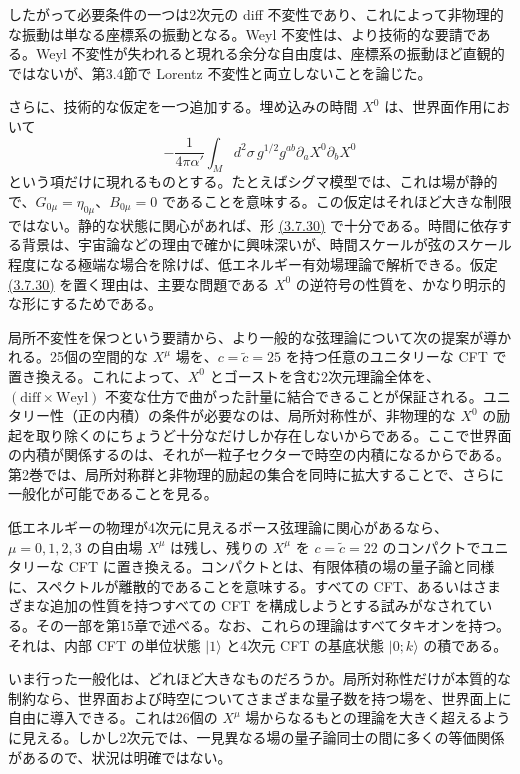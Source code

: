 したがって必要条件の一つは2次元の diff 不変性であり、これによって非物理的な振動は単なる座標系の振動となる。Weyl 不変性は、より技術的な要請である。Weyl 不変性が失われると現れる余分な自由度は、座標系の振動ほど直観的ではないが、第3.4節で Lorentz 不変性と両立しないことを論じた。

さらに、技術的な仮定を一つ追加する。埋め込みの時間 $X^0$ は、世界面作用において
\begin{equation}
-\frac1{4\pi\alpha'}\int_M d^2\sigma\,g^{1/2}g^{ab}
\partial_aX^0\partial_bX^0
\tag{3.7.30}\label{eq:3.7.30}
\end{equation}
という項だけに現れるものとする。たとえばシグマ模型では、これは場が静的で、$G_{0\mu}=\eta_{0\mu}$、$B_{0\mu}=0$ であることを意味する。この仮定はそれほど大きな制限ではない。静的な状態に関心があれば、形 \hyperref[eq:3.7.30]{(3.7.30)} で十分である。時間に依存する背景は、宇宙論などの理由で確かに興味深いが、時間スケールが弦のスケール程度になる極端な場合を除けば、低エネルギー有効場理論で解析できる。仮定 \hyperref[eq:3.7.30]{(3.7.30)} を置く理由は、主要な問題である $X^0$ の逆符号の性質を、かなり明示的な形にするためである。

局所不変性を保つという要請から、より一般的な弦理論について次の提案が導かれる。25個の空間的な $X^\mu$ 場を、$c=\widetilde c=25$ を持つ任意のユニタリーな CFT で置き換える。これによって、$X^0$ とゴーストを含む2次元理論全体を、$(\mathrm{diff}\times\mathrm{Weyl})$ 不変な仕方で曲がった計量に結合できることが保証される。ユニタリー性（正の内積）の条件が必要なのは、局所対称性が、非物理的な $X^0$ の励起を取り除くのにちょうど十分なだけしか存在しないからである。ここで世界面の内積が関係するのは、それが一粒子セクターで時空の内積になるからである。第2巻では、局所対称群と非物理的励起の集合を同時に拡大することで、さらに一般化が可能であることを見る。

低エネルギーの物理が4次元に見えるボース弦理論に関心があるなら、$\mu=0,1,2,3$ の自由場 $X^\mu$ は残し、残りの $X^\mu$ を $c=\widetilde c=22$ のコンパクトでユニタリーな CFT に置き換える。コンパクトとは、有限体積の場の量子論と同様に、スペクトルが離散的であることを意味する。すべての CFT、あるいはさまざまな追加の性質を持つすべての CFT を構成しようとする試みがなされている。その一部を第15章で述べる。なお、これらの理論はすべてタキオンを持つ。それは、内部 CFT の単位状態 $\lvert1\rangle$ と4次元 CFT の基底状態 $\lvert0;k\rangle$ の積である。

いま行った一般化は、どれほど大きなものだろうか。局所対称性だけが本質的な制約なら、世界面および時空についてさまざまな量子数を持つ場を、世界面上に自由に導入できる。これは26個の $X^\mu$ 場からなるもとの理論を大きく超えるように見える。しかし2次元では、一見異なる場の量子論同士の間に多くの等価関係があるので、状況は明確ではない。


